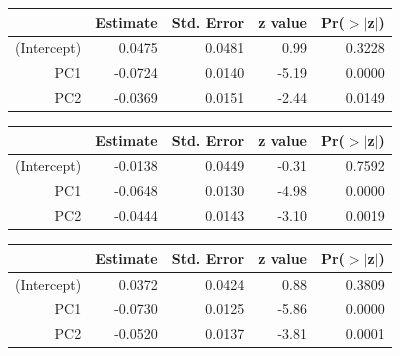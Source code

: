 \documentclass[a4paper,12pt]{Latex/Classes/PhDthesisPSnPDF}
\begin{document}
\newpage

\begin{center}
\begin{table}[ht]
\centering
\begin{tabular}{rrrrr}
  \hline
 & Estimate & Std. Error & z value & Pr($>$$|$z$|$) \\ 
  \hline
(Intercept) & 0.0475 & 0.0481 & 0.99 & 0.3228 \\ 
  PC1 & -0.0724 & 0.0140 & -5.19 & 0.0000 \\ 
  PC2 & -0.0369 & 0.0151 & -2.44 & 0.0149 \\ 
   \hline
\end{tabular}
\end{table}\end{center}

\begin{center}
\begin{table}[ht]
\centering
\begin{tabular}{rrrrr}
  \hline
 & Estimate & Std. Error & z value & Pr($>$$|$z$|$) \\ 
  \hline
(Intercept) & -0.0138 & 0.0449 & -0.31 & 0.7592 \\ 
  PC1 & -0.0648 & 0.0130 & -4.98 & 0.0000 \\ 
  PC2 & -0.0444 & 0.0143 & -3.10 & 0.0019 \\ 
   \hline
\end{tabular}
\end{table}\end{center}
\begin{center}
\begin{table}[ht]
\centering
\begin{tabular}{rrrrr}
  \hline
 & Estimate & Std. Error & z value & Pr($>$$|$z$|$) \\ 
  \hline
(Intercept) & 0.0372 & 0.0424 & 0.88 & 0.3809 \\ 
  PC1 & -0.0730 & 0.0125 & -5.86 & 0.0000 \\ 
  PC2 & -0.0520 & 0.0137 & -3.81 & 0.0001 \\ 
   \hline
\end{tabular}
\end{table}\end{center}
\end{document}
